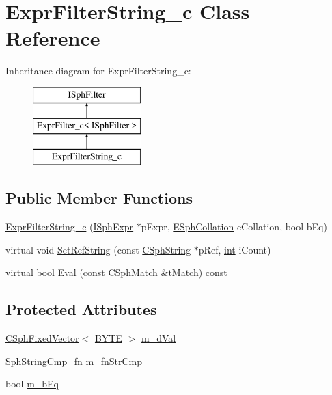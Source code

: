 \hypertarget{classExprFilterString__c}{\section{Expr\-Filter\-String\-\_\-c Class Reference}
\label{classExprFilterString__c}
}
Inheritance diagram for Expr\-Filter\-String\-\_\-c\-:\begin{figure}[H]
\begin{center}
\leavevmode
\includegraphics[height=3.000000cm]{classExprFilterString__c}
\end{center}
\end{figure}
\subsection*{Public Member Functions}
\begin{DoxyCompactItemize}
\item 
\hyperlink{classExprFilterString__c_ae1cdf5709322a8713c07727d023f7db8}{Expr\-Filter\-String\-\_\-c} (\hyperlink{structISphExpr}{I\-Sph\-Expr} $\ast$p\-Expr, \hyperlink{sphinxexpr_8h_a78197b7b74319074237ecaf5d99cfbe5}{E\-Sph\-Collation} e\-Collation, bool b\-Eq)
\item 
virtual void \hyperlink{classExprFilterString__c_adec744107d883351cfdb8f07c0fe7fa4}{Set\-Ref\-String} (const \hyperlink{structCSphString}{C\-Sph\-String} $\ast$p\-Ref, \hyperlink{sphinxexpr_8cpp_a4a26e8f9cb8b736e0c4cbf4d16de985e}{int} i\-Count)
\item 
virtual bool \hyperlink{classExprFilterString__c_a6bbcdfee523f1b33f0f04ca37ee41f80}{Eval} (const \hyperlink{classCSphMatch}{C\-Sph\-Match} \&t\-Match) const 
\end{DoxyCompactItemize}
\subsection*{Protected Attributes}
\begin{DoxyCompactItemize}
\item 
\hyperlink{classCSphFixedVector}{C\-Sph\-Fixed\-Vector}$<$ \hyperlink{sphinxstd_8h_a4ae1dab0fb4b072a66584546209e7d58}{B\-Y\-T\-E} $>$ \hyperlink{classExprFilterString__c_a99e8f854a5fb150360e457d5a6a72c81}{m\-\_\-d\-Val}
\item 
\hyperlink{sphinx_8h_a564bff07e446e0e31a63004937e8347b}{Sph\-String\-Cmp\-\_\-fn} \hyperlink{classExprFilterString__c_abcf6a320df6a1c9a687797f17259f40d}{m\-\_\-fn\-Str\-Cmp}
\item 
bool \hyperlink{classExprFilterString__c_ac8b233acb6be735f8c9e0ca25e519ee3}{m\-\_\-b\-Eq}
\end{DoxyCompactItemize}


